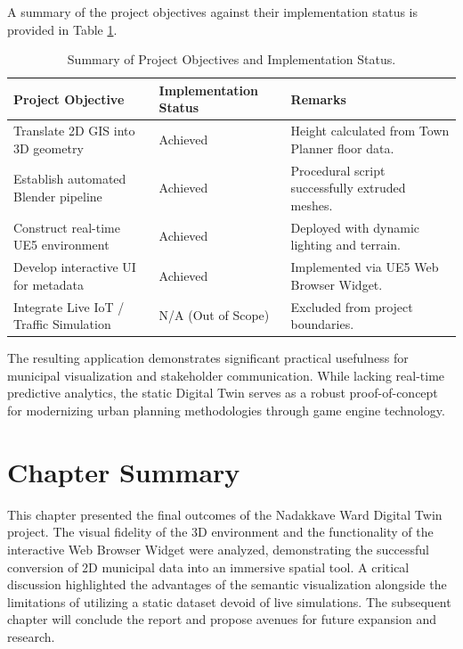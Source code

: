 A summary of the project objectives against their implementation status is provided in Table \ref{tab:objective_summary}.

\begin{table}[htbp]
    \centering
    \caption{Summary of Project Objectives and Implementation Status.}
    \label{tab:objective_summary}
    \begin{tabular}{p{} p{} p{}}
        \toprule
        \textbf{Project Objective} & \textbf{Implementation Status} & \textbf{Remarks} \\
        \midrule
        Translate 2D GIS into 3D geometry & Achieved & Height calculated from Town Planner floor data. \\
        Establish automated Blender pipeline & Achieved & Procedural script successfully extruded meshes. \\
        Construct real-time UE5 environment & Achieved & Deployed with dynamic lighting and terrain. \\
        Develop interactive UI for metadata & Achieved & Implemented via UE5 Web Browser Widget. \\
        Integrate Live IoT / Traffic Simulation & N/A (Out of Scope) & Excluded from project boundaries. \\
        \bottomrule
    \end{tabular}
\end{table}

The resulting application demonstrates significant practical usefulness for municipal visualization and stakeholder communication. While lacking real-time predictive analytics, the static Digital Twin serves as a robust proof-of-concept for modernizing urban planning methodologies through game engine technology.

\section{Chapter Summary}
This chapter presented the final outcomes of the Nadakkave Ward Digital Twin project. The visual fidelity of the 3D environment and the functionality of the interactive Web Browser Widget were analyzed, demonstrating the successful conversion of 2D municipal data into an immersive spatial tool. A critical discussion highlighted the advantages of the semantic visualization alongside the limitations of utilizing a static dataset devoid of live simulations. The subsequent chapter will conclude the report and propose avenues for future expansion and research.
